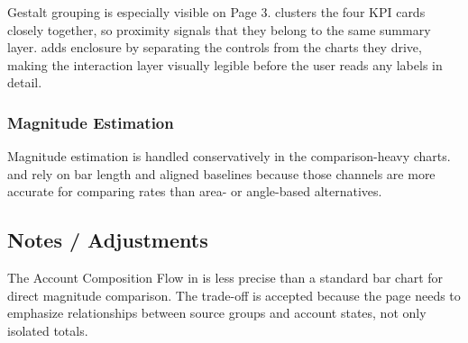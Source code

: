 \documentclass[../main.tex]{subfiles}
\begin{document}
Gestalt grouping is especially visible on Page 3.
 clusters the four KPI cards
closely together, so proximity signals that they belong to the same summary
layer.  adds enclosure by
separating the controls from the charts they drive, making the interaction
layer visually legible before the user reads any labels in detail.

\subsubsection{Magnitude Estimation}

Magnitude estimation is handled conservatively in the comparison-heavy charts.
 and
 rely on bar length
and aligned baselines because those channels are more accurate for comparing
rates than area- or angle-based alternatives.

\subsection{Notes / Adjustments}

The Account Composition Flow in
 is less
precise than a standard bar chart for direct magnitude comparison. The
trade-off is accepted because the page needs to emphasize relationships between
source groups and account states, not only isolated totals.
\end{document}
